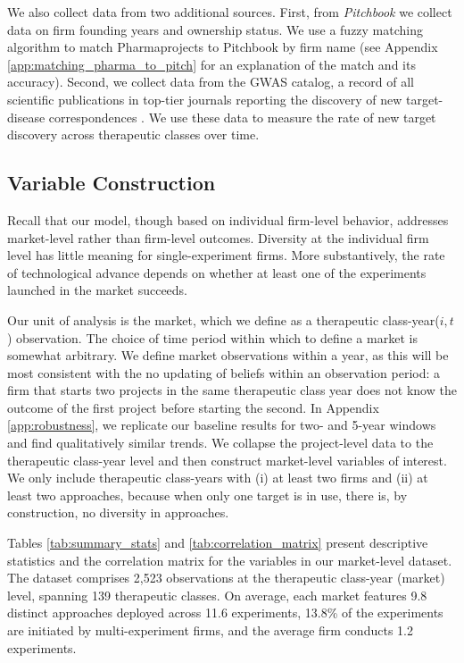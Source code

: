 We also collect data from two additional sources. First, from \emph{Pitchbook} we collect data on firm founding years and ownership status. We use a fuzzy matching algorithm to match Pharmaprojects to Pitchbook by firm name (see Appendix \ref{app:matching_pharma_to_pitch} for an explanation of the match and its accuracy). Second, we collect data from the GWAS catalog, a record of all scientific publications in top-tier journals reporting the discovery of new target-disease correspondences \citep{tranchero2023finding}. We use these data to measure the rate of new target discovery across therapeutic classes over time.

\subsection{Variable Construction}

Recall that our model, though based on individual firm-level behavior, addresses market-level rather than firm-level outcomes. Diversity at the individual firm level has little meaning for single-experiment firms. More substantively, the rate of technological advance depends on whether at least one of the experiments launched in the market succeeds.

Our unit of analysis is the market, which we define as a therapeutic class-year($i,t$) observation. The choice of time period within which to define a market is somewhat arbitrary. We define market observations within a year, as this will be most consistent with the no updating of beliefs within an observation period: a firm that starts two projects in the same therapeutic class year does not know the outcome of the first project before starting the second. In Appendix \ref{app:robustness}, we replicate our baseline results for two- and 5-year windows and find qualitatively similar trends. We collapse the project-level data to the therapeutic class-year level and then construct market-level variables of interest. We only include therapeutic class-years with (i) at least two firms and (ii) at least two approaches, because when only one target is in use, there is, by construction, no diversity in approaches.

Tables \ref{tab:summary_stats} and \ref{tab:correlation_matrix} present descriptive statistics and the correlation matrix for the variables in our market-level dataset. The dataset comprises 2,523 observations at the therapeutic class-year (market) level, spanning 139 therapeutic classes. On average, each market features 9.8 distinct approaches deployed across 11.6 experiments, 13.8\% of the experiments are initiated by multi-experiment firms, and the average firm conducts 1.2 experiments.

